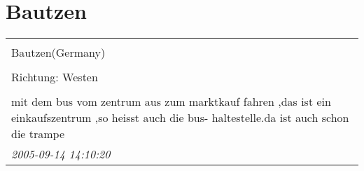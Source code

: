 \documentclass[a4paper,12pt]{article}
\begin{document}
\section{Bautzen}
\begin{tabular}{|p{13cm}|}
\hline\\
Bautzen(Germany)\\
\\
Richtung: Westen \\
\hline\\
mit dem bus vom zentrum aus zum marktkauf fahren ,das ist ein einkaufszentrum ,so heisst auch die bus-
haltestelle.da ist auch schon die trampe \\
\textit{ 2005-09-14 14:10:20 }\\\hline
\end{tabular}
\end{document}
